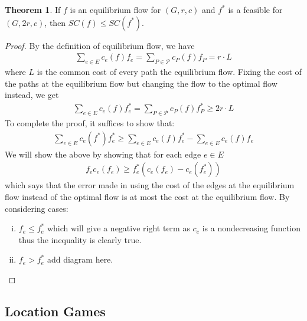\documentclass[a4paper,10pt]{article}
\theoremstyle{definition}
\newtheorem{thm}{Theorem}[section]
\newtheorem{defn}[thm]{Definition}
\begin{document}
\begin{thm}
If $f$ is an equilibrium flow for $(G,r,c)$ and $f^\ast$ is a feasible for $(G,2r,c)$, then $SC(f)\leq SC(f^\ast)$.
\begin{proof}
By the definition of equilibrium flow, we have
\begin{align*}
\sum_{e\in E}c_e(f)f_e=\sum_{P\in\mathcal{P}}c_P(f)f_P = r\cdot L
\end{align*}
where $L$ is the common cost of every path the equilibrium flow. Fixing the cost of the paths at the equilibrium flow but changing the flow to the optimal flow instead, we get
\begin{align*}
\sum_{e\in E}c_e(f)f^\ast_e=\sum_{P\in\mathcal{P}}c_P(f)f_P^\ast \geq 2r\cdot L
\end{align*}
To complete the proof, it suffices to show that: 
\begin{align*}
\sum_{e\in E}c_e(f^\ast)f^\ast_e \geq \sum_{e\in E}c_e(f)f^\ast_e-\sum_{e\in E}c_e(f)f_e
\end{align*}
We will show the above by showing that for each edge $e\in E$
\begin{align*}
f_ec_e(f_e) \geq f_e^\ast(c_e(f_e)-c_e(f_e^\ast))
\end{align*}
which says that the error made in using the cost of the edges at the equilibrium flow instead of the optimal flow is at most the cost at the equilibrium flow. By considering cases:
\begin{enumerate}[(i)]
\item $f_e\leq f_e^\ast$ which will give a negative right term as $c_e$ is a nondecreasing function thus the inequality is clearly true.
\item $f_e > f_e^\ast$
add diagram here.
\end{enumerate}
\end{proof}
\end{thm}


\subsection{Location Games}


\end{document}
